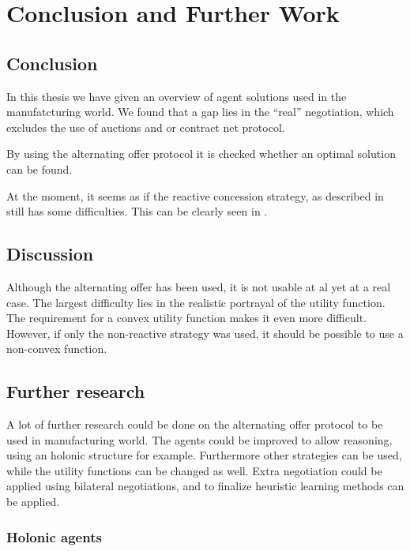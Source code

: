 \chapter{Conclusion and Further Work}
\section{Conclusion}
In this thesis we have given an overview of agent solutions used in the manufatcturing world. We found that a gap lies in the ``real'' negotiation, which excludes the use of auctions and or contract net protocol. 

By using the alternating offer protocol it is checked whether an optimal solution can be found. 

At the moment, it seems as if the reactive concession strategy, as described in \citet{zheng2015automated} still has some difficulties. This can be clearly seen in . 

\section{Discussion}
Although the alternating offer has been used, it is not usable at al yet at a real case. The largest difficulty lies in the realistic portrayal of the utility function. The requirement for a convex utility function makes it even more difficult. However, if only the non-reactive strategy was used, it should be possible to use a non-convex function.


\section{Further research}
A lot of further research could be done on the alternating offer protocol to be used in manufacturing world. The agents could be improved to allow reasoning, using an holonic structure for example. Furthermore other strategies can be used, while the utility functions can be changed as well. Extra negotiation could be applied using bilateral negotiations, and to finalize heuristic learning methods can be applied.

\subsection{Holonic agents}

